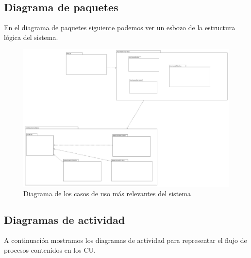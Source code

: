     \clearpage
    \subsection{Diagrama de paquetes}

   En el diagrama de paquetes siguiente podemos ver un esbozo de la estructura lógica del sistema.
      
    
    \begin{figure}[H] %
\centering
\includegraphics[scale=0.2]{imagenes/diagramas/diagrama_de_paquetes.png}  %

\caption{Diagrama de los casos de uso más relevantes del sistema}\label{figura20}
\end{figure}

    
    
    \newpage
    
   \subsection{Diagramas de actividad}

A continuación mostramos los diagramas de actividad para representar el flujo de procesos contenidos en los CU.


